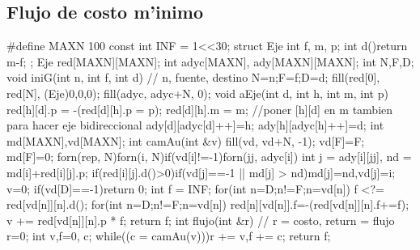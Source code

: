 \documentclass[10pt,landscape,twocolumn,a4paper,notitlepage]{article}
\begin{document}
\subsection{Flujo de costo m'inimo}
\begin{code}
#define MAXN 100
const int INF = 1<<30;
struct Eje{
	int f, m, p;
	int d(){return m-f;}
};
Eje red[MAXN][MAXN];
int adyc[MAXN], ady[MAXN][MAXN];
int N,F,D;
void iniG(int n, int f, int d){ // n, fuente, destino
	N=n;F=f;D=d;
	fill(red[0], red[N], (Eje){0,0,0});
	fill(adyc, adyc+N, 0);
}
void aEje(int d, int h, int m, int p){
	red[h][d].p = -(red[d][h].p = p);
	red[d][h].m = m; //poner [h][d] en m tambien para hacer eje bidireccional
	ady[d][adyc[d]++]=h; ady[h][adyc[h]++]=d;
}
int md[MAXN],vd[MAXN];
int camAu(int &v){
	fill(vd, vd+N, -1);
	vd[F]=F; md[F]=0;
	forn(rep, N)forn(i, N)if(vd[i]!=-1)forn(jj, adyc[i]){
		int j = ady[i][jj], nd = md[i]+red[i][j].p;
		if(red[i][j].d()>0)if(vd[j]==-1 || md[j] > nd)md[j]=nd,vd[j]=i;
	}
	v=0;
	if(vd[D]==-1)return 0;
	int f = INF;
	for(int n=D;n!=F;n=vd[n]) f <?= red[vd[n]][n].d();
	for(int n=D;n!=F;n=vd[n]){
		red[n][vd[n]].f=-(red[vd[n]][n].f+=f);
		v += red[vd[n]][n].p * f;
	}
	return f;
}
int flujo(int &r){ // r = costo, return = flujo
	r=0; int v,f=0, c;
	while((c = camAu(v)))r += v,f += c;
	return f;
}
\end{code}
\end{document}
